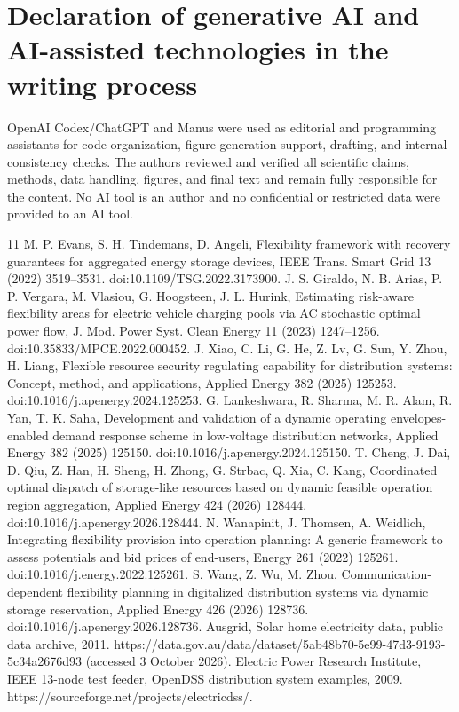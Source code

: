 \documentclass[11pt]{article}
\begin{document}
\section*{Declaration of generative AI and AI-assisted technologies in the writing process}
OpenAI Codex/ChatGPT and Manus were used as editorial and programming assistants for code organization, figure-generation support, drafting, and internal consistency checks. The authors reviewed and verified all scientific claims, methods, data handling, figures, and final text and remain fully responsible for the content. No AI tool is an author and no confidential or restricted data were provided to an AI tool.

\begin{thebibliography}{11}
 M. P. Evans, S. H. Tindemans, D. Angeli, Flexibility framework with recovery guarantees for aggregated energy storage devices, IEEE Trans. Smart Grid 13 (2022) 3519--3531. doi:10.1109/TSG.2022.3173900.
 J. S. Giraldo, N. B. Arias, P. P. Vergara, M. Vlasiou, G. Hoogsteen, J. L. Hurink, Estimating risk-aware flexibility areas for electric vehicle charging pools via AC stochastic optimal power flow, J. Mod. Power Syst. Clean Energy 11 (2023) 1247--1256. doi:10.35833/MPCE.2022.000452.
 J. Xiao, C. Li, G. He, Z. Lv, G. Sun, Y. Zhou, H. Liang, Flexible resource security regulating capability for distribution systems: Concept, method, and applications, Applied Energy 382 (2025) 125253. doi:10.1016/j.apenergy.2024.125253.
 G. Lankeshwara, R. Sharma, M. R. Alam, R. Yan, T. K. Saha, Development and validation of a dynamic operating envelopes-enabled demand response scheme in low-voltage distribution networks, Applied Energy 382 (2025) 125150. doi:10.1016/j.apenergy.2024.125150.
 T. Cheng, J. Dai, D. Qiu, Z. Han, H. Sheng, H. Zhong, G. Strbac, Q. Xia, C. Kang, Coordinated optimal dispatch of storage-like resources based on dynamic feasible operation region aggregation, Applied Energy 424 (2026) 128444. doi:10.1016/j.apenergy.2026.128444.
 N. Wanapinit, J. Thomsen, A. Weidlich, Integrating flexibility provision into operation planning: A generic framework to assess potentials and bid prices of end-users, Energy 261 (2022) 125261. doi:10.1016/j.energy.2022.125261.
 S. Wang, Z. Wu, M. Zhou, Communication-dependent flexibility planning in digitalized distribution systems via dynamic storage reservation, Applied Energy 426 (2026) 128736. doi:10.1016/j.apenergy.2026.128736.
 Ausgrid, Solar home electricity data, public data archive, 2011. https://data.gov.au/data/dataset/5ab48b70-5e99-47d3-9193-5c34a2676d93 (accessed 3 October 2026).
 Electric Power Research Institute, IEEE 13-node test feeder, OpenDSS distribution system examples, 2009. https://sourceforge.net/projects/electricdss/.
\end{thebibliography}
\end{document}
